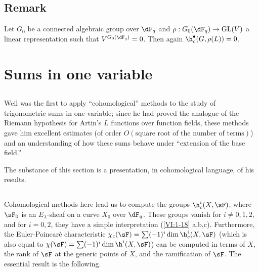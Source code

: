 \subsection{Remark}\label{VI:2-9}

Let $G_0$ be a connected algebraic group over $\dF_q$ and 
$\rho:G_0(\dF_q) \to \operatorname{GL}(V)$ a linear representation 
such that $V^{G_0(\dF_q)}=0$. Then again $\h_c^\bullet(G,\rho(L))=0$. 










\section{Sums in one variable}\label{VI:3}





\subsection{}\label{VI:3-1}

Weil was the first to apply ``cohomological'' methods to 
the study of trigonometric sums in one variable; since he had 
proved the analogue of the Riemann hypothesis for Artin's $L$ functions 
over function fields, these methods gave him excellent 
estimates (of order $O(\text{square root of the number of terms})$) and an 
understanding of how these sums behave under ``extension of the base field.'' 

The substance of this section is a presentation, in cohomological language, of 
his results. 





\subsection{}\label{VI:3-2}

Cohomological methods here lead us to compute the groups 
$\h_c^i(X,\sF)$, where $\sF_0$ is an $E_\lambda$-sheaf on a curve $X_0$ over 
$\dF_q$. These groups vanish for $i\ne 0,1,2$, and for 
$i=0,2$, they have a simple interpretation (\ref{VI:1-18} a,b,c). Furthermore, the 
Euler-Poincaré characteristic 
$\chi_c(\sF) = \sum (-1)^i \dim \h_c^i(X,\sF)$ (which is also equal to 
$\chi(\sF) = \sum (-1)^i \dim \h^i(X,\sF)$) can be computed in terms of 
$X$, the rank of $\sF$ at the generic points of $X$, and the 
ramification of $\sF$. The essential result is the following. 


